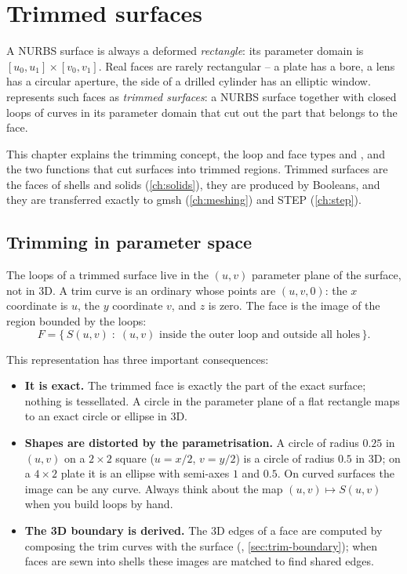 \chapter{Trimmed surfaces}\label{ch:trimming}

A NURBS surface is always a deformed \emph{rectangle}: its parameter domain is
$[u_0,u_1]\times[v_0,v_1]$. Real faces are rarely rectangular -- a plate has a bore, a lens
has a circular aperture, the side of a drilled cylinder has an elliptic window. \NF{}
represents such faces as \emph{trimmed surfaces}: a NURBS surface together with closed loops
of curves in its parameter domain that cut out the part that belongs to the face.

This chapter explains the trimming concept, the loop and face types
 and , and the two  functions that
cut surfaces into trimmed regions. Trimmed surfaces are the faces of shells and solids
(\cref{ch:solids}), they are produced by Booleans, and they are transferred exactly to gmsh
(\cref{ch:meshing}) and STEP (\cref{ch:step}).

\section{Trimming in parameter space}\label{sec:trim-concept}

The loops of a trimmed surface live in the $(u,v)$ parameter plane of the surface, not in 3D.
A trim curve is an ordinary  whose points are $(u, v, 0)$: the $x$ coordinate
is $u$, the $y$ coordinate $v$, and $z$ is zero. The face is the image of the region bounded
by the loops:
\[
F = \{\, S(u,v) \;:\; (u,v) \text{ inside the outer loop and outside all holes} \,\}.
\]

This representation has three important consequences:

\begin{itemize}
\item \textbf{It is exact.} The trimmed face is exactly the part of the exact surface;
nothing is tessellated. A circle in the parameter plane of a flat rectangle maps to an exact
circle or ellipse in 3D.
\item \textbf{Shapes are distorted by the parametrisation.} A circle of radius $0.25$ in
$(u,v)$ on a $2\times2$ square ($u = x/2$, $v=y/2$) is a circle of radius $0.5$ in 3D; on a
$4\times2$ plate it is an ellipse with semi-axes $1$ and $0.5$. On curved surfaces the image
can be any curve. Always think about the map $(u,v)\mapsto S(u,v)$ when you build loops by
hand.
\item \textbf{The 3D boundary is derived.} The 3D edges of a face are computed by composing
the trim curves with the surface (, \cref{sec:trim-boundary}); when faces
are sewn into shells these images are matched to find shared edges.
\end{itemize}

